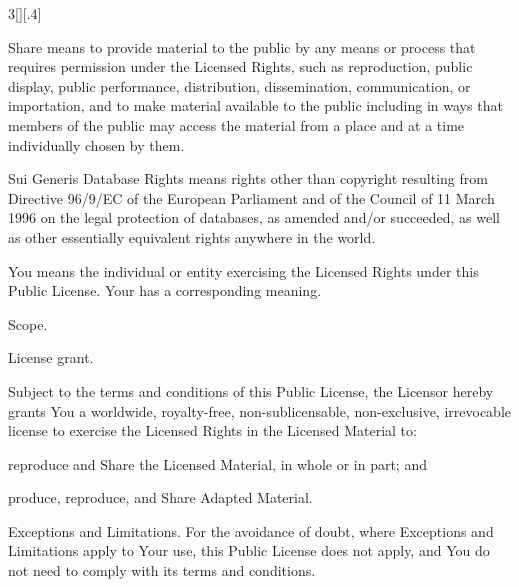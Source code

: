 \documentclass[8pt,a4paper]{article}
\begin{document}
\begin{multicols}{3}[][.4\paperwidth]
\begin{longenum}
\begin{longenum}
  \item Share means to provide material to the public by any means or
     process that requires permission under the Licensed Rights, such
     as reproduction, public display, public performance, distribution,
     dissemination, communication, or importation, and to make material
     available to the public including in ways that members of the
     public may access the material from a place and at a time
     individually chosen by them.

  \item Sui Generis Database Rights means rights other than copyright
     resulting from Directive 96/9/EC of the European Parliament and of
     the Council of 11 March 1996 on the legal protection of databases,
     as amended and/or succeeded, as well as other essentially
     equivalent rights anywhere in the world.

  \item You means the individual or entity exercising the Licensed Rights
     under this Public License. Your has a corresponding meaning.

  \end{longenum}

  \item Scope.

  \begin{longenum}
  \item License grant.

       \begin{longenum}

       \item Subject to the terms and conditions of this Public License,
          the Licensor hereby grants You a worldwide, royalty-free,
          non-sublicensable, non-exclusive, irrevocable license to
          exercise the Licensed Rights in the Licensed Material to:

            \begin{longenum}

            \item reproduce and Share the Licensed Material, in whole or
               in part; and

            \item produce, reproduce, and Share Adapted Material.

            \end{longenum}

       \item Exceptions and Limitations. For the avoidance of doubt, where
          Exceptions and Limitations apply to Your use, this Public
          License does not apply, and You do not need to comply with
          its terms and conditions.


\end{longenum}
\end{longenum}
\end{longenum}
\end{multicols}
\end{document}
